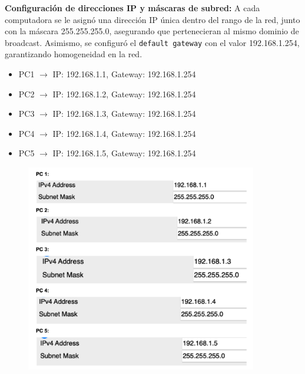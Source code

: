 \documentclass[letterpaper,12pt,oneside]{article}
\begin{document}
\textbf{Configuración de direcciones IP y máscaras de subred:} A cada computadora se le asignó una dirección IP única dentro del rango de la red, junto con la máscara 255.255.255.0, asegurando que pertenecieran al mismo dominio de broadcast. Asimismo, se configuró el \texttt{default gateway} con el valor 192.168.1.254, garantizando homogeneidad en la red.
\begin{itemize}
    \item PC1 $\rightarrow$ IP: 192.168.1.1, Gateway: 192.168.1.254
    \item PC2 $\rightarrow$ IP: 192.168.1.2, Gateway: 192.168.1.254
    \item PC3 $\rightarrow$ IP: 192.168.1.3, Gateway: 192.168.1.254
    \item PC4 $\rightarrow$ IP: 192.168.1.4, Gateway: 192.168.1.254
    \item PC5 $\rightarrow$ IP: 192.168.1.5, Gateway: 192.168.1.254
\end{itemize}
\begin{figure}[h!]
    \centering
    \includegraphics[width=0.9\textwidth]{4.png}
\end{figure}
\end{document}
